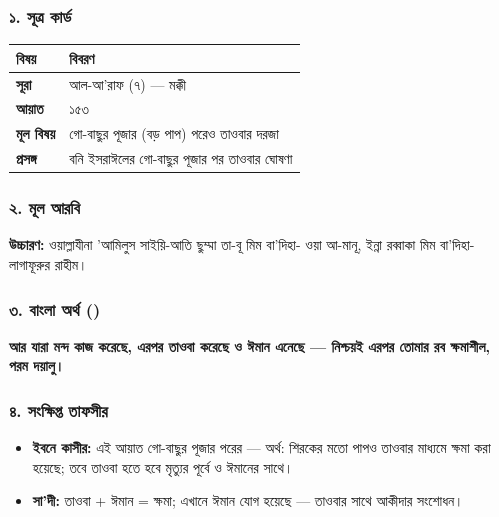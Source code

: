 \subsubsection*{১. সূত্র কার্ড}

\begin{table}[h]\centering\small
\begin{tabular}{ll}
বিষয় & বিবরণ \\
\hline
\textbf{সূরা} & আল-আ'রাফ (৭) — মক্কী \\
\textbf{আয়াত} & ১৫৩ \\
\textbf{মূল বিষয়} & গো-বাছুর পূজার (বড় পাপ) পরেও তাওবার দরজা \\
\textbf{প্রসঙ্গ} & বনি ইসরাঈলের গো-বাছুর পূজার পর তাওবার ঘোষণা \\
\hline
\end{tabular}
\end{table}

\subsubsection*{২. মূল আরবি}

\begin{center}\end{center}
\textbf{উচ্চারণ:} ওয়াল্লাযীনা 'আমিলুস সাইয়ি-আতি ছুম্মা তা-বূ মিম বা'দিহা- ওয়া আ-মানূ, ইন্না রব্বাকা মিম বা'দিহা- লাগাফূরুর রাহীম।

\subsubsection*{৩. বাংলা অর্থ ()}

\textbf{আর যারা মন্দ কাজ করেছে, এরপর তাওবা করেছে ও ঈমান এনেছে — নিশ্চয়ই এরপর তোমার রব ক্ষমাশীল, পরম দয়ালু।}

\subsubsection*{৪. সংক্ষিপ্ত তাফসীর}

\begin{itemize}
\item \textbf{ইবনে কাসীর:} এই আয়াত গো-বাছুর পূজার পরের — অর্থ: শিরকের মতো পাপও তাওবার মাধ্যমে ক্ষমা করা হয়েছে; তবে তাওবা হতে হবে মৃত্যুর পূর্বে ও ঈমানের সাথে।
\item \textbf{সা'দী:} তাওবা + ঈমান = ক্ষমা; এখানে ঈমান যোগ হয়েছে — তাওবার সাথে আকীদার সংশোধন।
\end{itemize}
